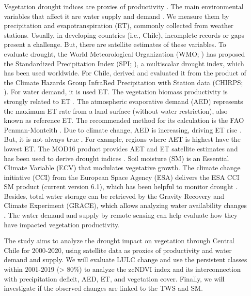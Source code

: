 \documentclass[preprint,
3p]{elsarticle} %
\begin{document}
Vegetation drought indices are proxies of productivity
\citep{Paruelo2016, Schucknecht2017}. The main environmental variables
that affect it are water supply and demand \citep{Mishra2015}. We
measure them by precipitation and evapotranspiration (ET), commonly
collected from weather stations. Usually, in developing countries (i.e.,
Chile), incomplete records or gaps present a challenge. But, there are
satellite estimates of these variables. To evaluate drought, the World
Meteorological Organization (WMO; \citep{WMO2012}) has proposed the
Standardized Precipitation Index (SPI; \citep{McKee1993}), a multiscalar
drought index, which has been used worldwide. For Chile,
\citet{Zambrano2017} derived and evaluated it from the product of the
Climate Hazards Group InfraRed Precipitation with Station data (CHIRPS;
\citep{Funk2015}). For water demand, it is used ET. The vegetation
biomass productivity is strongly related to ET \citep{FAO66}. The
atmospheric evaporative demand (AED) represents the maximum ET rate from
a land surface (without water restriction), also known as reference ET.
The recommended method for its calculation is the FAO Penman-Monteith
\citep{Pereira2015, Allen2005}. Due to climate change, AED is
increasing, driving ET rise \citep{IPCCCH112021}. But, it is not always
true \citep{Milly2016}. For example, regions where AET is highest have
the lowest ET. The MOD16 product \citep{Running2021, Mu2011} provides
AET and ET satellite estimates and has been used to derive drought
indices \citep{Mu2013}. Soil moisture (SM) is an Essential Climate
Variable (ECV) that modulates vegetative growth. The climate change
initiative (CCI) from the European Space Agency (ESA) delivers the ESA
CCI SM product \citep{Dorigo2017} (current version 6.1), which has been
helpful to monitor drought \citep{Zhang2019}. Besides, total water
storage can be retrieved by the Gravity Recovery and Climate Experiment
(GRACE), which allows analyzing water availability changes
\citep{Ahmed2014, Ma2017}. The water demand and supply by remote sensing
can help evaluate how they have impacted vegetation productivity.

The study aims to analyze the drought impact on vegetation through
Central Chile for 2000-2020, using satellite data as proxies of
productivity and water demand and supply. We will evaluate LULC change
and use the persistent classes within 2001-2019 (\textgreater{} 80\%) to
analyze the zcNDVI index and its interconnection with precipitation
deficit, AED, ET, and vegetation cover. Finally, we will investigate if
the observed changes are linked to the TWS and SM.
\end{document}

